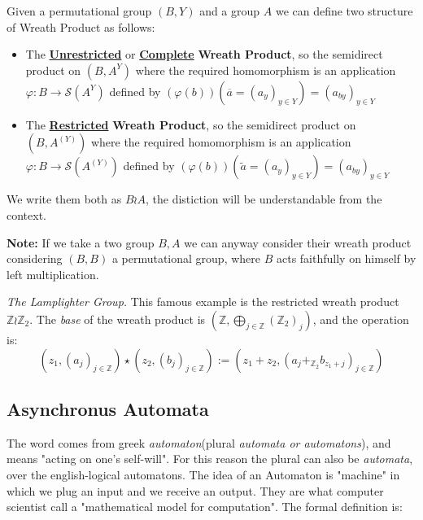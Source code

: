 \documentclass[mat1]{fmfdeloTS}
\newcommand{\Z}{\mathbb Z}
\begin{document}
\begin{definition}
Given a permutational group $(B,Y)$ and a group $A$ we can define two structure of Wreath Product as follows:
\begin{itemize}
\item The \textbf{\underline{Unrestricted}} or \textbf{\underline{Complete}} \textbf{Wreath Product}, so the semidirect product on $(B,A^{Y})$ where the required homomorphism is an application $\varphi:B\longrightarrow \mathcal{S}(A^Y)$ defined by $(\varphi(b))(\overline{a}=(a_y)_{y\in Y})=(a_{by})_{y\in Y}$
\item The \textbf{\underline{Restricted}} \textbf{Wreath Product}, so the semidirect product on $(B,A^{(Y)})$ where the required homomorphism is an application $\varphi:B\longrightarrow \mathcal{S}(A^{(Y)})$ defined by $(\varphi(b))(\widetilde a=(a_y)_{y\in Y})=(a_{by})_{y\in Y} $
\end{itemize}
We write them both as $B\wr A$, the distiction will be understandable from the context.
\end{definition}
\textbf{Note:} If we take a two group $B,A$ we can anyway consider their wreath product considering $(B,B)$ a permutational group, where $B$ acts faithfully on himself by left multiplication.



\begin{example}
\textit{The Lamplighter Group.} This famous example is the restricted wreath product $\Z\wr\Z_2$. The \textit{base} of the wreath product is $(\Z,\bigoplus_{j\in\Z} ({\Z_2})_j)$, and the operation is:
$$(z_1, (a_{j})_{j\in\Z})\star(z_2, (b_{j})_{j\in\Z}):=(z_1+z_2, (a_j+_{\Z_2}b_{z_1+j})_{j\in\Z})$$
\end{example}
\bigskip
\bigskip
\bigskip
\subsection{Asynchronus Automata}
The word comes from greek \textit{automaton}(plural \textit{automata \textit{or} automatons}), and means "acting on one's self-will". For this reason the plural can also be \textit{automata}, over the english-logical automatons.
The idea of an Automaton is "machine" in which we plug an input and we receive an output. They are what computer scientist call a "mathematical model for computation". The formal definition is:
\end{document}
